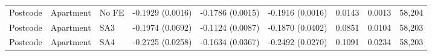 \begin{table}[!htbp]
{\begin{tabular}{lllllllll}
Postcode & Apartment & No FE & -0.1929 (0.0016) & -0.1786 (0.0015) & -0.1916 (0.0016) & 0.0143 & 0.0013 & 58,204 \\
Postcode & Apartment & SA3 & -0.1974 (0.0692) & -0.1124 (0.0087) & -0.1870 (0.0402) & 0.0851 & 0.0104 & 58,203 \\
Postcode & Apartment & SA4 & -0.2725 (0.0258) & -0.1634 (0.0367) & -0.2492 (0.0270) & 0.1091 & 0.0234 & 58,203 \\
\end{tabular}
}
\par{}
\end{table}
